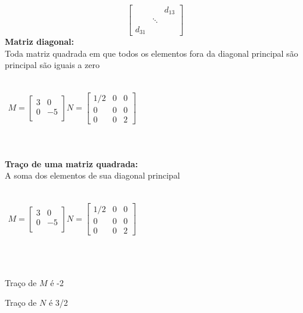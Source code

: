 \documentclass[15pt]{article}
\begin{document}
\[
\begin{bmatrix}
&  & d_{13} \\
& \ddots &  \\
d_{31} & &  
\end{bmatrix}
\]
\textbf{Matriz diagonal:}
\\
Toda matriz quadrada em que todos os elementos fora da diagonal principal são principal são iguais a zero 
\\\\
\centerline{
$\begin{matrix}
M=
\begin{bmatrix}
3 & 0\\
0 & -5\\
\end{bmatrix}
N=
\begin{bmatrix}
1/2 & 0 & 0\\
0 & 0 & 0\\
0 & 0 & 2
\end{bmatrix}
\end{matrix}$
}
\\
\\
\textbf{Traço de uma matriz quadrada:}\\
A soma dos elementos de sua diagonal principal
\\\\
\centerline{
$\begin{matrix}
M=
\begin{bmatrix}
3 & 0\\
0 & -5\\
\end{bmatrix}
N=
\begin{bmatrix}
1/2 & 0 & 0\\
0 & 0 & 0\\
0 & 0 & 2
\end{bmatrix}
\end{matrix}$
}
\\\\
\centerline{
Traço de $M$ é -2
}
\centerline{
Traço de $N$ é 3/2
}
\end{document}
